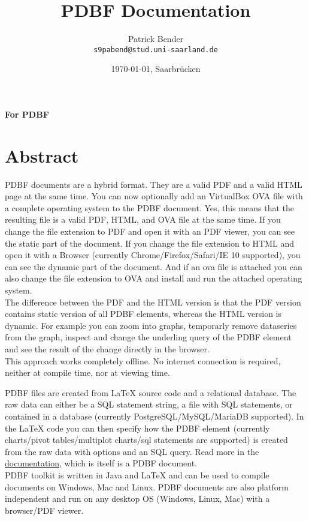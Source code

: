 \documentclass[11pt]{article}
\title{PDBF Documentation}
\author{
 Patrick Bender\\
  \texttt{s9pabend@stud.uni-saarland.de}
}
\date{\today{}, Saarbrücken}
\begin{document}
\maketitle
\noindent \textbf{For PDBF }

\section{Abstract}
PDBF documents are a hybrid format. They are a valid PDF and a valid HTML page at the same time. You can now optionally add an VirtualBox OVA file with a complete operating system to the PDBF document. Yes, this means that the resulting file is a valid PDF, HTML, and OVA file at the same time. If you change the file extension to PDF and open it with an PDF viewer, you can see the static part of the document. If you change the file extension to HTML and open it with a Browser (currently Chrome/Firefox/Safari/IE 10 supported), you can see the dynamic part of the document. And if an ova file is attached you can also change the file extension to OVA and install and run the attached operating system.\\
The difference between the PDF and the HTML version is that the PDF version contains static version of all PDBF elements, whereas the HTML version is dynamic. For example you can zoom into graphs, temporarly remove dataseries from the graph, inspect and change the underling query of the PDBF element and see the result of the change directly in the browser.\\
This approach works completely offline. No internet connection is required, neither at compile time, nor at viewing time.

\noindent PDBF files are created from LaTeX source code and a relational database. The raw data can either be a SQL statement string, a file with SQL statements, or contained in a database (currently PostgreSQL/MySQL/MariaDB supported). In the LaTeX code you can then specify how the PDBF element (currently charts/pivot tables/multiplot charts/sql statements are supported) is created from the raw data with options and an SQL query. Read more in the \href{http://uds-datalab.github.io/PDBF/}{documentation}, which is itself is a PDBF document.\\

\noindent PDBF toolkit is written in Java and LaTeX and can be used to compile documents on Windows, Mac and Linux. PDBF documents are also platform independent and run on any desktop OS (Windows, Linux, Mac) with a browser/PDF viewer.\\
\end{document}
